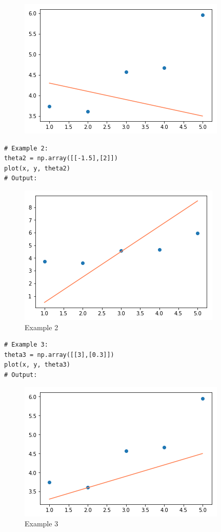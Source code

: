 \documentclass{42-en}
\begin{document}
\begin{figure}[H]
  \centering
  \includegraphics[scale=0.6]{assets/plot1.png}
\end{figure}

\newpage

\begin{verbatim}
# Example 2:
theta2 = np.array([[-1.5],[2]])
plot(x, y, theta2)
# Output:
\end{verbatim}

\begin{figure}[H]
  \centering
  \includegraphics[scale=0.6]{assets/plot2.png}
  \caption{Example 2}
\end{figure}

\begin{verbatim}
# Example 3:
theta3 = np.array([[3],[0.3]])
plot(x, y, theta3)
# Output:
\end{verbatim}

\begin{figure}[H]
  \centering
  \includegraphics[scale=0.6]{assets/plot3.png}
  \caption{Example 3}
\end{figure}
\end{document}
